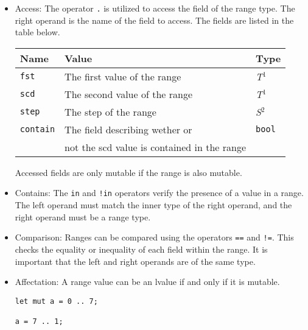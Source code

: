 \begin{itemize}
\item Access: The operator \texttt{.} is utilized to access the field of the
  range type. The right operand is the name of the field to access. The fields
  are listed in the table below.

  \begin{center}\begin{adjustbox}{max width=\linewidth}
    \begin{threeparttable}
      \begin{tabular}{|l|ll|}
        \hline
        Name & Value & Type\\
        \hline
        \hline
        \texttt {fst} & The first value of the range & \textit{T}$^{1^{\phantom{j}}}$ \\
        \texttt {scd} & The second value of the range & \textit{T}$^{1^{\phantom{j}}}$ \\
        \texttt {step} & The step of the range & \textit{S}$^{2^{\phantom{j}}}$ \\
        \texttt {contain} & The field describing wether or  & \texttt{bool} \\
        & not the scd value is contained in the range &\\
        \hline
      \end{tabular}
    \end{threeparttable}
\end{adjustbox}\end{center}

Accessed fields are only mutable if the range is also mutable.

\item Contains: The \texttt{in} and \texttt{!in} operators verify the presence
  of a value in a range. The left operand must match the inner type of the right
  operand, and the right operand must be a range type.

\item Comparison: Ranges can be compared using the operators \texttt{==} and
  \texttt{!=}. This checks the equality or inequality of each field within the
  range. It is important that the left and right operands are of the same type.

\item Affectation: A range value can be an lvalue if and only if it is mutable.
  \begin{lstlisting}[style=coloredverbatim]
let mut a = 0 .. 7;

a = 7 .. 1;
  \end{lstlisting}

\end{itemize}

